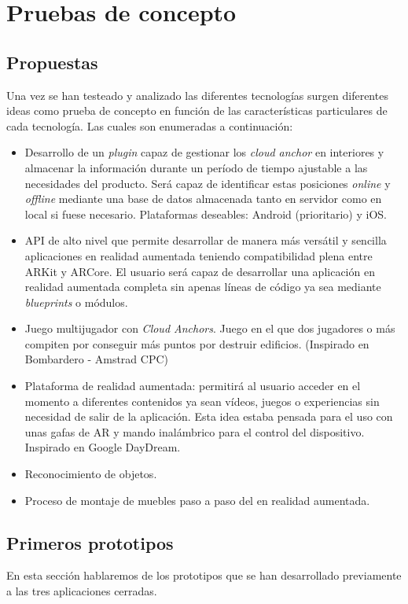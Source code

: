 \chapter{Pruebas de concepto}
\section{Propuestas}
Una vez se han testeado y analizado las diferentes tecnologías surgen diferentes ideas como prueba de concepto en función de las características particulares de cada tecnología. Las cuales son enumeradas a continuación:

\begin{itemize}
\item Desarrollo de un \textit{plugin} capaz de gestionar los \textit{cloud anchor} en interiores y almacenar la información durante un período de tiempo ajustable a las necesidades del producto. Será capaz de identificar estas posiciones \textit{online} y \textit{offline} mediante una base de datos almacenada tanto en servidor como en local si fuese necesario. Plataformas deseables: Android (prioritario) y iOS. 
\item API de alto nivel que permite desarrollar de manera más versátil y sencilla aplicaciones en realidad aumentada teniendo compatibilidad plena entre ARKit y ARCore. El usuario será capaz de desarrollar una aplicación en realidad aumentada completa sin apenas líneas de código ya sea mediante \textit{blueprints} o módulos.
\item Juego multijugador con \textit{Cloud Anchors}. Juego en el que dos jugadores o más compiten por conseguir más puntos por destruir edificios. (Inspirado en Bombardero - Amstrad CPC)
\item Plataforma de realidad aumentada: permitirá al usuario acceder en el momento a diferentes contenidos ya sean vídeos, juegos o experiencias sin necesidad de salir de la aplicación. Esta idea estaba pensada para el uso con unas gafas de AR y mando inalámbrico para el control del dispositivo. Inspirado en Google DayDream.
\item Reconocimiento de objetos.
\item Proceso de montaje de muebles paso a paso del en realidad aumentada.
\end{itemize}

\clearpage
\section{Primeros prototipos}
En esta sección hablaremos de los prototipos que se han desarrollado previamente a las tres aplicaciones cerradas.\\

